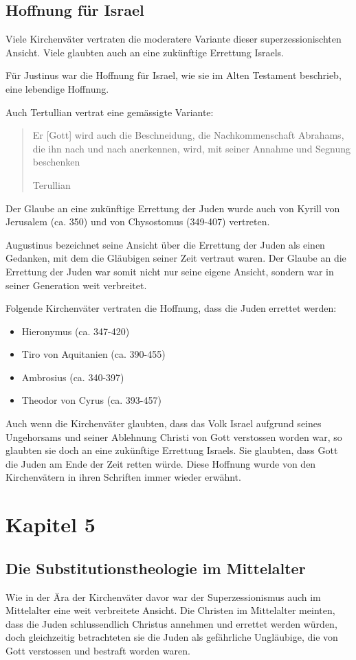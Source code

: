 \documentclass{../../inc/mybib}
\newcommand{\st}{Substitutionstheolog}
\newcommand{\sz}{Superzessionismus}
\begin{document}
    \subsection{Hoffnung für Israel}
    Viele Kirchenväter vertraten die moderatere Variante dieser superzessionischten Ansicht. Viele glaubten auch an eine zukünftige Errettung Israels.

    Für Justinus war die Hoffnung für Israel, wie sie im Alten Testament beschrieb, eine lebendige Hoffnung.

    Auch Tertullian vertrat eine gemässigte Variante:
    \blockquote[Terullian]{Er [Gott] wird auch die Beschneidung, die Nachkommenschaft Abrahams, die ihn nach  und nach anerkennen, wird, mit seiner Annahme und Segnung beschenken}

    Der Glaube an eine zukünftige Errettung der Juden wurde auch von Kyrill von Jerusalem (ca. 350) und von Chysostomus (349-407) vertreten. 

    Augustinus bezeichnet seine Ansicht über die Errettung der Juden als einen Gedanken, mit dem die Gläubigen seiner Zeit vertraut waren. Der Glaube an die Errettung der Juden war somit nicht nur seine eigene Ansicht, sondern war in seiner Generation weit verbreitet.

    Folgende Kirchenväter vertraten die Hoffnung, dass die Juden errettet werden:
    \begin{itemize}
        \item Hieronymus (ca. 347-420)
        \item Tiro von Aquitanien (ca. 390-455)
        \item Ambrosius (ca. 340-397)
        \item Theodor von Cyrus (ca. 393-457)
    \end{itemize}
    Auch wenn die Kirchenväter glaubten, dass das Volk Israel aufgrund seines Ungehorsams und seiner Ablehnung Christi von Gott verstossen worden war, so glaubten sie doch an eine zukünftige Errettung Israels. Sie glaubten, dass Gott die Juden am Ende der Zeit retten würde. Diese Hoffnung wurde von den Kirchenvätern in ihren Schriften immer wieder erwähnt.
    \section{Kapitel 5}
    \subsection{Die \st ie im Mittelalter}
    Wie in der Ära der Kirchenväter davor war der \sz{} auch im Mittelalter eine weit verbreitete Ansicht. Die Christen im Mittelalter meinten, dass die Juden schlussendlich Christus annehmen und errettet werden würden, doch gleichzeitig betrachteten sie die Juden als gefährliche Ungläubige, die von Gott verstossen und bestraft worden waren.
\end{document}
